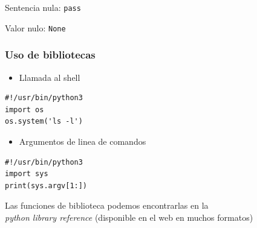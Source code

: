\begin{frame}[fragile]
 
Sentencia nula: \verb|pass|

Valor nulo: \verb|None| 

\end{frame}


\begin{frame}[fragile]
\frametitle{Uso de bibliotecas}



\begin{itemize}
\item  Llamada al shell
\end{itemize}


  \begin{footnotesize}
\begin{verbatim}
#!/usr/bin/python3
import os
os.system('ls -l')
\end{verbatim}
  \end{footnotesize}

\begin{itemize}
\item Argumentos de linea de comandos
\end{itemize}



  \begin{footnotesize}
\begin{verbatim}
#!/usr/bin/python3
import sys
print(sys.argv[1:])

\end{verbatim}
  \end{footnotesize}
Las funciones de biblioteca podemos encontrarlas
en la \\\emph{python library reference}
(disponible en el web en muchos formatos)
\end{frame}












